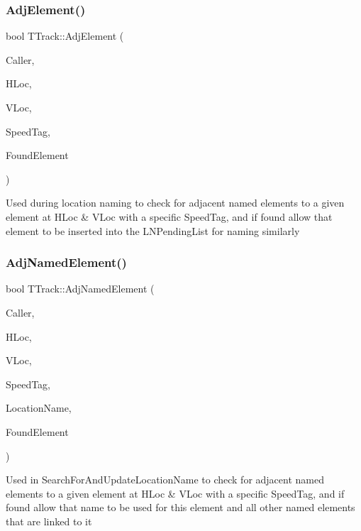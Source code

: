 \subsubsection{\texorpdfstring{Adj\+Element()}{AdjElement()}}
{\footnotesize\ttfamily bool T\+Track\+::\+Adj\+Element (\begin{DoxyParamCaption}\item[{int}]{Caller,  }\item[{int}]{H\+Loc,  }\item[{int}]{V\+Loc,  }\item[{int}]{Speed\+Tag,  }\item[{int \&}]{Found\+Element }\end{DoxyParamCaption})}

Used during location naming to check for adjacent named elements to a given element at H\+Loc \& V\+Loc with a specific Speed\+Tag, and if found allow that element to be inserted into the L\+N\+Pending\+List for naming similarly \mbox{\label{class_t_track_a96a3a6bcd38491f4f00ec2a585c6f170}} 
\subsubsection{\texorpdfstring{Adj\+Named\+Element()}{AdjNamedElement()}}
{\footnotesize\ttfamily bool T\+Track\+::\+Adj\+Named\+Element (\begin{DoxyParamCaption}\item[{int}]{Caller,  }\item[{int}]{H\+Loc,  }\item[{int}]{V\+Loc,  }\item[{int}]{Speed\+Tag,  }\item[{Ansi\+String \&}]{Location\+Name,  }\item[{int \&}]{Found\+Element }\end{DoxyParamCaption})}

Used in Search\+For\+And\+Update\+Location\+Name to check for adjacent named elements to a given element at H\+Loc \& V\+Loc with a specific Speed\+Tag, and if found allow that name to be used for this element and all other named elements that are linked to it \mbox{\label{class_t_track_a928a29de1b2a916a1c829d40b68963e9}} 
